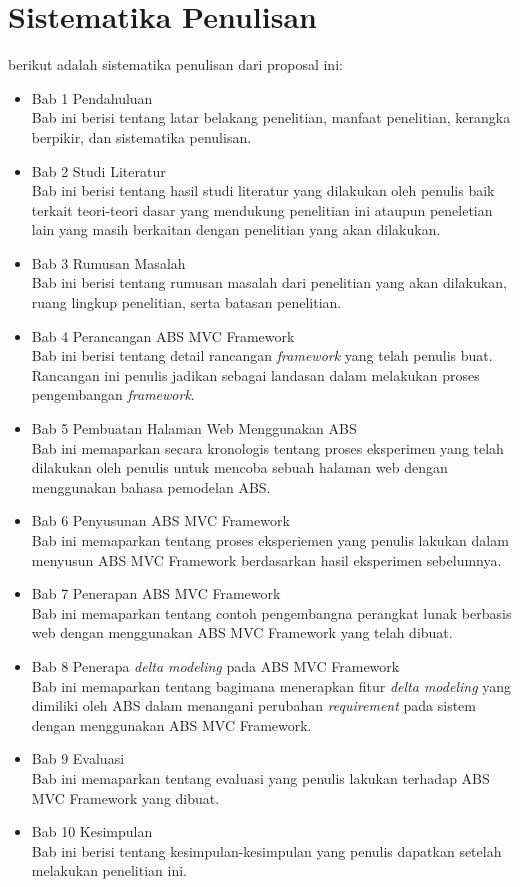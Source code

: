 \section{Sistematika Penulisan}
berikut adalah sistematika penulisan dari proposal ini:
\begin{itemize}
    \item Bab 1 Pendahuluan \\
    Bab ini berisi tentang latar belakang penelitian, manfaat penelitian, kerangka berpikir, dan sistematika penulisan.
    \item Bab 2 Studi Literatur \\
    Bab ini berisi tentang hasil studi literatur yang dilakukan oleh penulis baik terkait teori-teori dasar yang mendukung penelitian ini ataupun peneletian lain yang masih berkaitan dengan penelitian yang akan dilakukan.
    \item Bab 3 Rumusan Masalah \\
    Bab ini berisi tentang rumusan masalah dari penelitian yang akan dilakukan, ruang lingkup penelitian, serta batasan penelitian.
    \item Bab 4 Perancangan ABS MVC Framework \\
    Bab ini berisi tentang detail rancangan \textit{framework} yang telah penulis buat. Rancangan ini penulis jadikan sebagai landasan dalam melakukan proses pengembangan \textit{framework}.
    \item Bab 5 Pembuatan Halaman Web Menggunakan ABS \\
    Bab ini memaparkan secara kronologis tentang proses eksperimen yang telah dilakukan oleh penulis untuk mencoba sebuah halaman web dengan menggunakan bahasa pemodelan ABS.
    \item Bab 6 Penyusunan ABS MVC Framework \\
    Bab ini memaparkan tentang proses eksperiemen yang penulis lakukan dalam menyusun ABS MVC Framework berdasarkan hasil eksperimen sebelumnya.
    \item Bab 7 Penerapan ABS MVC Framework \\
    Bab ini memaparkan tentang contoh pengembangna perangkat lunak berbasis web dengan menggunakan ABS MVC Framework yang telah dibuat.
    \item Bab 8 Penerapa \textit{delta modeling} pada ABS MVC Framework \\
    Bab ini memaparkan tentang bagimana menerapkan fitur \textit{delta modeling} yang dimiliki oleh ABS dalam menangani perubahan \textit{requirement} pada sistem dengan menggunakan ABS MVC Framework.
    \item Bab 9 Evaluasi \\
    Bab ini memaparkan tentang evaluasi yang penulis lakukan terhadap ABS MVC Framework yang dibuat.
    \item Bab 10 Kesimpulan \\
    Bab ini berisi tentang kesimpulan-kesimpulan yang penulis dapatkan setelah melakukan penelitian ini.
\end{itemize}
